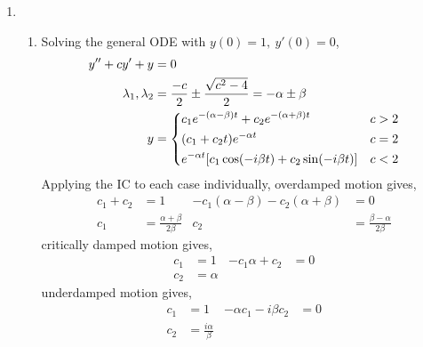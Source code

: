 \begin{enumerate}
    \item
          \begin{enumerate}
              \item Solving the general ODE with $ y(0) = 1,\ y'(0) = 0 $,
                    \begin{align}
                        y'' + cy' + y            & = 0                                                                                                                                       \\
                        \lambda_{1}, \lambda_{2} & = \frac{-c}{2} \pm \frac{\sqrt{c^{2} - 4}}{2} = -\alpha \pm \beta                                                                         \\
                        y                        & = \begin{dcases}
                                                         c_{1}e^{-(\alpha - \beta)t} + c_{2}e^{-(\alpha + \beta) t}  & c > 2 \\
                                                         (c_{1} + c_{2}t)e^{-\alpha t}                               & c = 2 \\
                                                         e^{-\alpha t}[c_{1}\cos(-i\beta t) + c_{2} \sin(-i\beta t)] & c < 2
                                                     \end{dcases}
                    \end{align}
                    Applying the IC to each case individually, overdamped motion gives,
                    \begin{align}
                        c_{1} + c_{2} & = 1                             & -c_{1}(\alpha - \beta) - c_{2}(\alpha + \beta) & = 0                             \\
                        c_{1}         & = \frac{\alpha + \beta}{2\beta} & c_{2}                                          & = \frac{\beta - \alpha}{2\beta}
                    \end{align}
                    critically damped motion gives,
                    \begin{align}
                        c_{1} & = 1      & -c_{1}\alpha + c_{2} & = 0 \\
                        c_{2} & = \alpha
                    \end{align}
                    underdamped motion gives,
                    \begin{align}
                        c_{1} & = 1                     & -\alpha c_{1} - i\beta c_{2} & = 0 \\
                        c_{2} & = \frac{i\alpha}{\beta}
                    \end{align}


\end{enumerate}
\end{enumerate}
